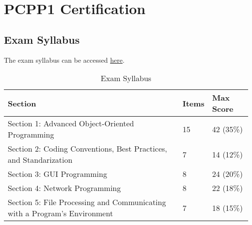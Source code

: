 \section{PCPP1 Certification}
\subsection{Exam Syllabus}
%

The exam syllabus can be accessed \href{https://pythoninstitute.org/assets/628def5091da2303121759.pdf}{here}.

\begin{table}[htbp]
    \centering
    \begin{tabular}{lll} %
        \toprule
        \textbf{Section} & \textbf{Items} & \textbf{Max Score} \\
        \midrule
        Section 1: Advanced Object-Oriented Programming & 15 & 42 (35\%) \\
        Section 2: Coding Conventions, Best Practices, and Standarization  & 7 & 14 (12\%) \\
        Section 3: GUI Programming & 8 & 24 (20\%) \\
        Section 4: Network Programming & 8 & 22 (18\%) \\
        Section 5: File Processing and Communicating with a Program’s Environment & 7 & 18 (15\%) \\
        \bottomrule
    \end{tabular}
    \caption{Exam Syllabus}
    \label{tab:exam_sections}
\end{table}

\newpage
